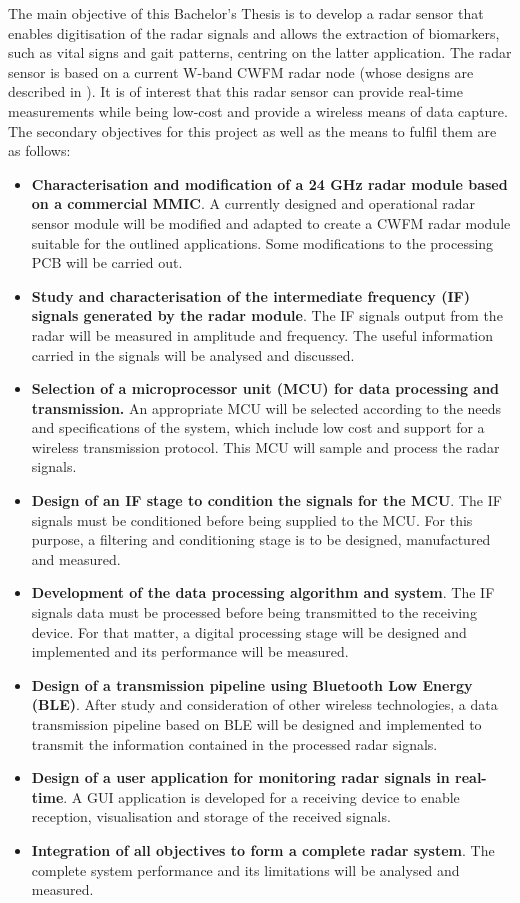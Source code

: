 	The main objective of this Bachelor's Thesis is to develop a radar sensor that enables digitisation of the radar signals and allows the extraction of biomarkers, such as vital signs and gait patterns, centring on the latter application. The radar sensor is based on a current W-band CWFM radar node (whose designs are described in \cite{Sardinero2022,Montesano2019}). It is of interest that this radar sensor can provide real-time measurements while being low-cost and provide a wireless means of data capture. The secondary objectives for this project as well as the means to fulfil them are as follows:
	\begin{itemize}
		\item \textbf{Characterisation and modification of a 24 GHz radar module based on a commercial MMIC}. A currently designed and operational radar sensor module will be modified and adapted to create a CWFM radar module suitable for the outlined applications. Some modifications to the processing PCB will be carried out.
		\item \textbf{Study and characterisation of the intermediate frequency (IF) signals generated by the radar module}. The IF signals output from the radar will be measured in amplitude and frequency. The useful information carried in the signals will be analysed and discussed.
		\item \textbf{Selection of a microprocessor unit (MCU) for data processing and transmission.} An appropriate MCU will be selected according to the needs and specifications of the system, which include low cost and support for a wireless transmission protocol. This MCU will sample and process the radar signals.
		\item \textbf{Design of an IF stage to condition the signals for the MCU}. The IF signals must be conditioned before being supplied to the MCU. For this purpose, a filtering and conditioning stage is to be designed, manufactured and measured.
		\item \textbf{Development of the data processing algorithm and system}. The IF signals data must be processed before being transmitted to the receiving device. For that matter, a digital processing stage will be designed and implemented and its performance will be measured.
		\item \textbf{Design of a transmission pipeline using Bluetooth Low Energy (BLE)}. After study and consideration of other wireless technologies, a data transmission pipeline based on BLE will be designed and implemented to transmit the information contained in the processed radar signals.
		\item \textbf{Design of a user application for monitoring radar signals in real-time}. A GUI application is developed for a receiving device to enable reception, visualisation and storage of the received signals.
		\item \textbf{Integration of all objectives to form a complete radar system}. The complete system performance and its limitations will be analysed and measured.
	\end{itemize}

